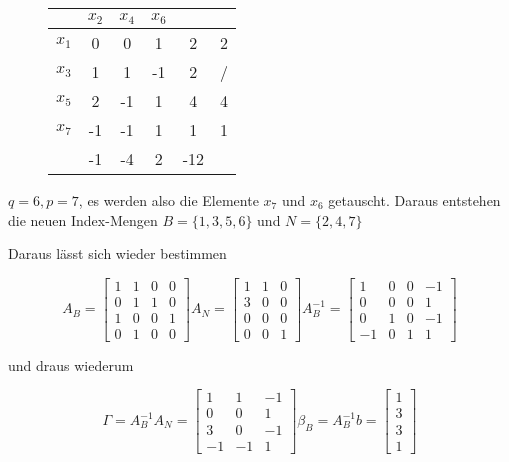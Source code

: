 \documentclass[a4paper, 12pt]{report}
\begin{document}
\begin{figure}[H]
  \centering
  \def\arraystretch{1.25}
  \begin{tabular}{l|c c c|c|c}
    & $x_2$ & $x_4$ & $x_6$ & &\\
    \hline
    $x_1$ & 0 & 0 & 1 & 2 & 2\\
    $x_3$ & 1 & 1 & -1 & 2 & /\\
    $x_5$ & 2 & -1 & 1 & 4 & 4\\
    $x_7$ & -1 & -1 & \colorbox{blue!30}{1} & 1 & 1\\
    \hline
    & -1 & -4 & 2 & -12 &
  \end{tabular}
\end{figure}

$q = 6, p = 7$, es werden also die Elemente $x_7$ und $x_6$ getauscht. Daraus entstehen die neuen Index-Mengen
$B = \{1, 3, 5, 6\}$ und $N=\{2, 4, 7\}$

Daraus lässt sich wieder bestimmen

$$ A_B = \begin{bmatrix} 1 & 1 & 0 & 0\\0 & 1 & 1 & 0\\1 & 0 & 0 & 1\\0 & 1 & 0 & 0 \end{bmatrix} A_N = \begin{bmatrix} 1 & 1 & 0\\3 & 0 & 0\\0 & 0 & 0\\0 & 0 & 1 \end{bmatrix} A_B^{-1} = \begin{bmatrix} 1 & 0 & 0 & -1\\0 & 0 & 0 & 1\\0 & 1 & 0 & -1\\-1 & 0 & 1 & 1 \end{bmatrix} $$

und draus wiederum

$$ \Gamma = A_B^{-1}A_N = \begin{bmatrix} 1 & 1 & -1\\0 & 0 & 1\\3 & 0 & -1\\-1 & -1 & 1 \end{bmatrix} \beta_B = A_B^{-1}b = \begin{bmatrix} 1\\3\\3\\1 \end{bmatrix} $$
\end{document}
